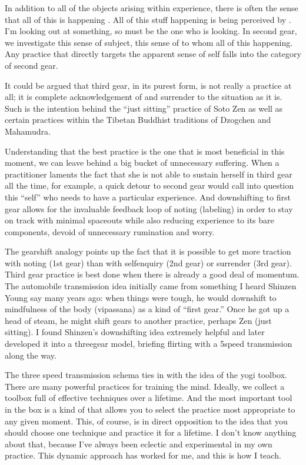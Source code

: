 \documentclass[a5paper,10pt,english]{book}
\begin{document}
\sphinxAtStartPar
In addition to all of the objects arising within experience, there is
often the sense that all of this is happening . All of this stuff
happening  is being perceived by . I’m looking
out at something, so  must be the one who is looking. In second gear,
we investigate this sense of subject, this sense of  to whom all of
this happening. Any practice that directly targets the apparent sense of
self falls into the category of second gear.

\sphinxAtStartPar
It could be argued that third gear, in its purest form, is not really a
practice at all; it is complete acknowledgement of and surrender to the
situation as it is. Such is the intention behind the “just sitting”
practice of Soto Zen as well as certain practices within the Tibetan
Buddhist traditions of Dzogchen and Mahamudra.

\sphinxAtStartPar
Understanding that the best practice is the one that is most beneficial
in this moment, we can leave behind a big bucket of unnecessary
suffering. When a practitioner laments the fact that she is not able to
sustain herself in third gear all the time, for example, a quick detour
to second gear would call into question this “self” who needs to have a
particular experience. And downshifting to first gear allows for the
invaluable feedback loop of noting (labeling) in order to stay on track
with minimal space\sphinxhyphen{}outs while also reducing experience to its bare
components, devoid of unnecessary rumination and worry.

\sphinxAtStartPar
The gearshift analogy points up the fact that it is possible to get more
traction with noting (1st gear) than with self\sphinxhyphen{}enquiry (2nd gear) or
surrender (3rd gear). Third gear practice is best done when there is
already a good deal of momentum. The automobile transmission idea
initially came from something I heard Shinzen Young say many years ago:
when things were tough, he would downshift to mindfulness of the body
(vipassana) as a kind of “first gear.” Once he got up a head of steam,
he might shift gears to another practice, perhaps Zen  (just
sitting). I found Shinzen’s downshifting idea extremely helpful and
later developed it into a three\sphinxhyphen{}gear model, briefing flirting with a
5\sphinxhyphen{}speed transmission along the way.

\sphinxAtStartPar
The three speed transmission schema ties in with the idea of the yogi
toolbox. There are many powerful practices for training the mind.
Ideally, we collect a toolbox full of effective techniques over a
lifetime. And the most important tool in the box is a kind of
 that allows you to select the practice most appropriate to
any given moment. This, of course, is in direct opposition to the idea
that you should choose one technique and practice it for a lifetime. I
don’t know anything about that, because I’ve always been eclectic and
experimental in my own practice. This dynamic approach has worked for
me, and this is how I teach.
\end{document}
